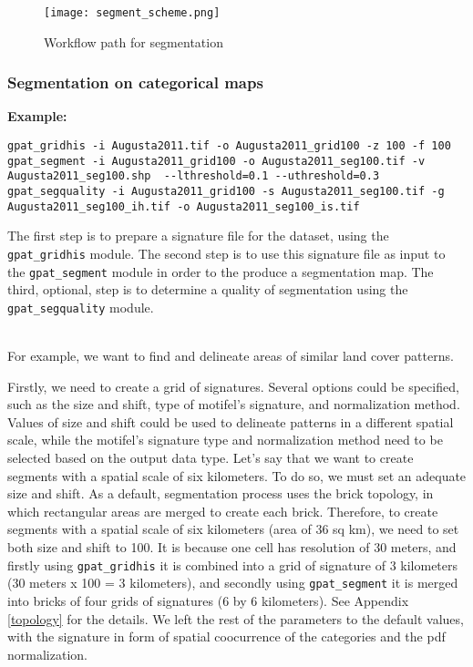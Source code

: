 \begin{figure}[H]
	\centering
	\texttt{[image: segment\_scheme.png]}
	\caption{Workflow path for segmentation}
	\label{FIG:SEGMENT}
\end{figure}

\subsubsection{Segmentation on categorical maps}

{\bf Example:}

\begin{minipage}{\linewidth}
\begin{lstlisting}
gpat_gridhis -i Augusta2011.tif -o Augusta2011_grid100 -z 100 -f 100
gpat_segment -i Augusta2011_grid100 -o Augusta2011_seg100.tif -v Augusta2011_seg100.shp  --lthreshold=0.1 --uthreshold=0.3
gpat_segquality -i Augusta2011_grid100 -s Augusta2011_seg100.tif -g Augusta2011_seg100_ih.tif -o Augusta2011_seg100_is.tif
\end{lstlisting}
\end{minipage}

The first step is to prepare a signature file for the dataset, using the {\tt gpat\_gridhis} module.
The second step is to use this signature file as input to the {\tt gpat\_segment} module in order to the produce a segmentation map. 
The third, optional, step is to determine a quality of segmentation using the {\tt gpat\_segquality} module.\\\\

\newpage

For example, we want to find and delineate areas of similar land cover patterns. 

Firstly, we need to create a grid of signatures. 
Several options could be specified, such as the size and shift, type of motifel's signature, and normalization method.
Values of size and shift could be used to delineate patterns in a different spatial scale, while the motifel's signature type and normalization method need to be selected based on the output data type.
Let's say that we want to create segments with a spatial scale of six kilometers. 
To do so, we must set an adequate size and shift. 
As a default, segmentation process uses the brick topology, in which rectangular areas are merged to create each brick.
Therefore, to create segments with a spatial scale of six kilometers (area of 36 sq km), we need to set both size and shift to 100.
It is because one cell has resolution of 30 meters, and firstly using {\tt gpat\_gridhis} it is combined into a grid of signature of 3 kilometers (30 meters x 100 = 3 kilometers), and secondly using {\tt gpat\_segment} it is merged into bricks of four grids of signatures (6 by 6 kilometers). 
See Appendix \ref{topology} for the details.
We left the rest of the parameters to the default values, with the signature in form of spatial coocurrence of the categories and the pdf normalization.


